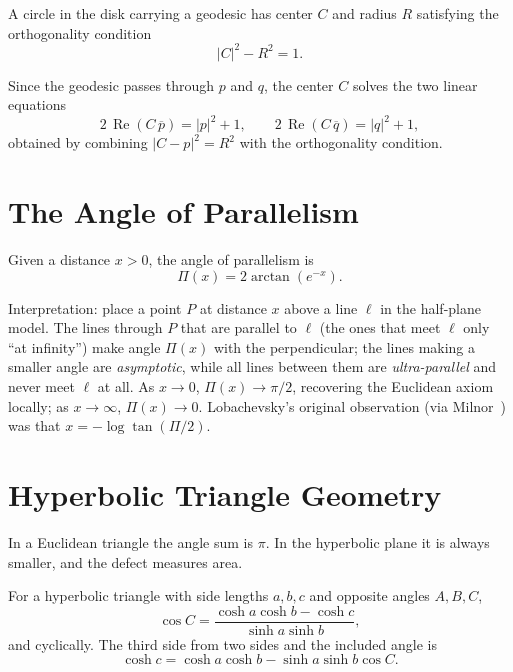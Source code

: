 \begin{proposition}
A circle in the disk carrying a geodesic has center $C$ and radius $R$ satisfying the orthogonality condition
\[
\lvert C \rvert^2 - R^2 = 1.
\]
\end{proposition}

Since the geodesic passes through $p$ and $q$, the center $C$ solves the two linear equations
\[
2\,\operatorname{Re}(C\, \overline{p}) = \lvert p \rvert^2 + 1, \qquad
2\,\operatorname{Re}(C\, \overline{q}) = \lvert q \rvert^2 + 1,
\]
obtained by combining $\lvert C - p \rvert^2 = R^2$ with the orthogonality condition.

\section{The Angle of Parallelism}

\begin{definition}
Given a distance $x > 0$, the angle of parallelism is
\[
\Pi(x) = 2\arctan(e^{-x}).
\]
\end{definition}

Interpretation: place a point $P$ at distance $x$ above a line $\ell$ in the half-plane model. The lines through $P$ that are parallel to $\ell$ (the ones that meet $\ell$ only ``at infinity'') make angle $\Pi(x)$ with the perpendicular; the lines making a smaller angle are \emph{asymptotic}, while all lines between them are \emph{ultra-parallel} and never meet $\ell$ at all. As $x \to 0$, $\Pi(x) \to \pi/2$, recovering the Euclidean axiom locally; as $x \to \infty$, $\Pi(x) \to 0$. Lobachevsky's original observation (via Milnor~\cite{milnor-hyperbolic}) was that $x = -\log \tan(\Pi/2)$.

\section{Hyperbolic Triangle Geometry}

In a Euclidean triangle the angle sum is $\pi$. In the hyperbolic plane it is always smaller, and the defect measures area.

\begin{theorem}
For a hyperbolic triangle with side lengths $a, b, c$ and opposite angles $A, B, C$,
\[
\cos C = \frac{\cosh a \cosh b - \cosh c}{\sinh a \sinh b},
\]
and cyclically. The third side from two sides and the included angle is
\[
\cosh c = \cosh a \cosh b - \sinh a \sinh b \cos C.
\]
\end{theorem}

